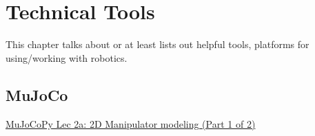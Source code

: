 \chapter{Technical Tools}

This chapter talks about or at least lists out helpful tools, platforms for using/working with robotics.

\section{MuJoCo}
\href{https://youtu.be/Fiq_hpaoeH0}{MuJoCoPy Lec 2a: 2D Manipulator modeling (Part 1 of 2)}